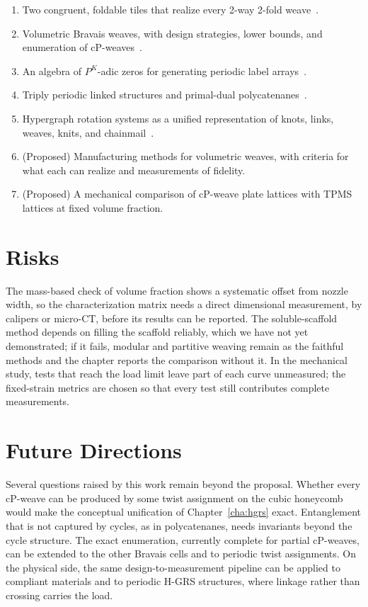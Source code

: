 \begin{enumerate}
\item[\textbf{C1}] Two congruent, foldable tiles that realize every 2-way 2-fold weave~\cite{yildiz2023modular}.
\item[\textbf{C2}] Volumetric Bravais weaves, with design strategies, lower bounds, and enumeration of cP-weaves~\cite{yildiz2025volumetric,akpanya2025enumeration}.
\item[\textbf{C3}] An algebra of $P^K$-adic zeros for generating periodic label arrays~\cite{yildiz2024nonwoven}.
\item[\textbf{C4}] Triply periodic linked structures and primal-dual polycatenanes~\cite{yildiz2025linked,yildiz2026polycatenane}.
\item[\textbf{C5}] Hypergraph rotation systems as a unified representation of knots, links, weaves, knits, and chainmail~\cite{yildiz2026hypergraph}.
\item[\textbf{C6}] (Proposed) Manufacturing methods for volumetric weaves, with criteria for what each can realize and measurements of fidelity.
\item[\textbf{C7}] (Proposed) A mechanical comparison of cP-weave plate lattices with TPMS lattices at fixed volume fraction.
\end{enumerate}

\section{Risks}

The mass-based check of volume fraction shows a systematic offset from nozzle width, so the characterization matrix needs a direct dimensional measurement, by calipers or micro-CT, before its results can be reported. The soluble-scaffold method depends on filling the scaffold reliably, which we have not yet demonstrated; if it fails, modular and partitive weaving remain as the faithful methods and the chapter reports the comparison without it. In the mechanical study, tests that reach the load limit leave part of each curve unmeasured; the fixed-strain metrics are chosen so that every test still contributes complete measurements.

\section{Future Directions}

Several questions raised by this work remain beyond the proposal. Whether every cP-weave can be produced by some twist assignment on the cubic honeycomb would make the conceptual unification of Chapter~\ref{cha:hgrs} exact. Entanglement that is not captured by cycles, as in polycatenanes, needs invariants beyond the cycle structure. The exact enumeration, currently complete for partial cP-weaves, can be extended to the other Bravais cells and to periodic twist assignments. On the physical side, the same design-to-measurement pipeline can be applied to compliant materials and to periodic H-GRS structures, where linkage rather than crossing carries the load.

